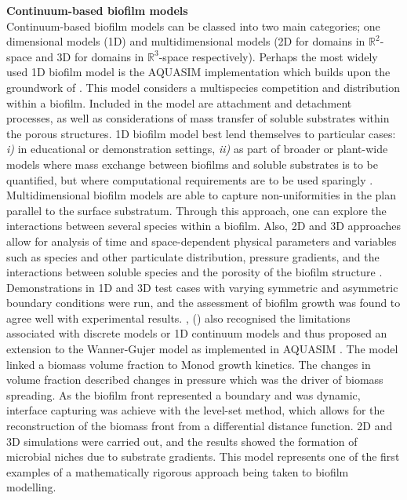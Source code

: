 \textbf{Continuum-based biofilm models}\\
Continuum-based biofilm models can be classed into two main categories; one dimensional models (1D) and multidimensional models (2D for domains in $\mathbb{R}^2$-space and 3D for domains in $\mathbb{R}^3$-space respectively). Perhaps the most widely used 1D biofilm model is the AQUASIM implementation \cite{reichert1994} which builds upon the groundwork of \cite{wanner1986} \cite{wanner1986}. This model considers a multispecies competition and distribution within a biofilm. Included in the model are attachment and detachment processes, as well as considerations of mass transfer of soluble substrates within the porous structures. 1D biofilm model best lend themselves to particular cases: \textit{i)} in educational or demonstration settings, \textit{ii)} as part of broader or plant-wide models where mass exchange between biofilms and soluble substrates is to be quantified, but where computational requirements are to be used sparingly \cite{dacunto2017}.
\skippingparagraph
Multidimensional biofilm models are able to capture non-uniformities in the plan parallel to the surface substratum. Through this approach, one can explore the interactions between several species within a biofilm. Also, 2D and 3D approaches allow for analysis of time and space-dependent physical parameters and variables such as species and other particulate distribution, pressure gradients, and the interactions between soluble species and the porosity of the biofilm structure \cite{eberl2001}. Demonstrations in 1D and 3D test cases with varying symmetric and asymmetric boundary conditions were run, and the assessment of biofilm growth was found to agree well with experimental results. \cite{alpkvist2007}, (\cite{alpkvist2007}) also recognised the limitations associated with discrete models or 1D continuum models and thus proposed an extension to the Wanner-Gujer model as implemented in AQUASIM \cite{wanner1986}. The model linked a biomass volume fraction to Monod growth kinetics. The changes in volume fraction described changes in pressure which was the driver of biomass spreading. As the biofilm front represented a boundary and was dynamic, interface capturing was achieve with the level-set method, which allows for the reconstruction of the biomass front from a differential distance function. 2D and 3D simulations were carried out, and the results showed the formation of microbial niches due to substrate gradients. This model represents one of the first examples of a mathematically rigorous approach being taken to biofilm modelling.
\skippingparagraph

